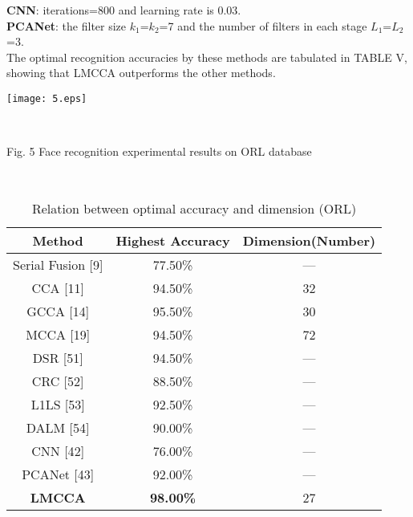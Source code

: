 \documentclass[journal]{IEEEtran}
\begin{document}
\textbf{CNN}: iterations=800 and learning rate is 0.03.\\
\textbf{PCANet}: the filter size $k_1$=$k_2$=7 and the number of filters in each stage $L_1$=$L_2$=3.\\\indent
The optimal recognition accuracies by these methods are tabulated in TABLE V, showing that LMCCA outperforms the other methods.\\\indent
\centerline {\texttt{[image: 5.eps]}}\\  \centerline {Fig. 5 Face recognition experimental results on ORL database}\\\indent
\vspace*{-10pt}
\begin{table}[h]
\small
\renewcommand{\arraystretch}{1.4}
\caption{\normalsize{Relation between optimal accuracy and dimension (ORL)}}
\setlength{\abovecaptionskip}{0pt}
\setlength{\belowcaptionskip}{10pt}
\centering
\tabcolsep 0.07in
\begin{tabular}{ccc}
\hline
Method & Highest Accuracy & Dimension(Number)\\
\hline
Serial Fusion [9] &77.50\% & ---\\
CCA [11] &94.50\% & 32\\
GCCA [14] &95.50\% & 30\\
MCCA [19] &94.50\% & 72\\
DSR [51] &94.50\% & ---\\
CRC [52] &88.50\%& ---\\
L1LS [53] &92.50\%& ---\\
DALM [54] &90.00\%& ---\\
CNN [42] &76.00\% & ---\\
PCANet [43] &92.00\% & ---\\
\textbf{LMCCA} &\textbf{98.00\%} & 27\\
\hline
\end{tabular}
\end{table}
\end{document}
